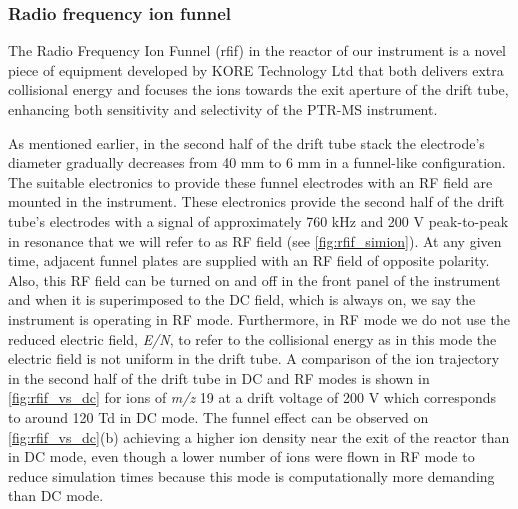 \subsubsection{Radio frequency ion funnel}\label{section:rfif}
The Radio Frequency Ion Funnel (\acrshort{rfif}) in the reactor of our instrument is a novel piece of equipment developed by KORE Technology Ltd that both delivers extra collisional energy and focuses the ions towards the exit aperture of the drift tube, enhancing both sensitivity and selectivity of the PTR-MS instrument.

As mentioned  earlier, in the second half of the drift tube stack the electrode's diameter gradually decreases from 40 mm to 6 mm in a funnel-like configuration. The suitable electronics to provide these funnel electrodes with an RF field are mounted in the instrument. These electronics
provide the second half of the drift tube's electrodes with a signal of approximately 760 kHz and 200 V peak-to-peak in resonance that we will refer to as RF field (see \autoref{fig:rfif_simion}). At any given time, adjacent funnel plates are supplied with an RF field of opposite polarity. Also, this RF field can be turned on and off in the front panel of the instrument and when it is superimposed to the DC field, which is always on, we say the instrument is operating in RF mode.
Furthermore, in RF mode we do not use the reduced electric field, \textit{E/N}, to refer to the collisional energy as in this mode the electric field is not uniform in the drift tube. A comparison of the ion trajectory  in the second half of the drift tube in DC and RF modes is shown in \autoref{fig:rfif_vs_dc} for ions of \textit{m/z} 19 at a drift voltage of 200 V which corresponds to around 120 Td in DC mode. The funnel effect can be observed on \autoref{fig:rfif_vs_dc}(b) achieving a higher ion density near the exit of the reactor than in DC mode, even though a lower number of ions were flown in RF mode to reduce simulation times because this mode is computationally more demanding than DC mode.



